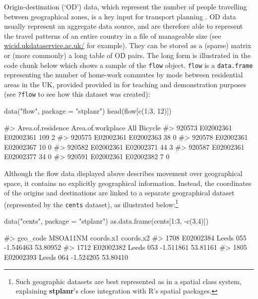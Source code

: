 Origin-destination (`OD') data, which represent the number of people travelling between
geographical zones, is a key input for transport planning \citep{calabrese_estimating_2011}.
OD data usually represent an aggregate data source, and are therefore able to represent the
travel patterns of an entire country in a file of manageable size
(see \href{http://wicid.ukdataservice.ac.uk/}{wicid.ukdataservice.ac.uk/} for example).
They can be stored as a (sparse) matrix or (more commonly) a long table of OD pairs.
The long form is illustrated in the code chunk below which shows a sample of
the \texttt{flow} object.
\texttt{flow} is a \texttt{data.frame} representing the number
of home-work commutes by mode between residential
areas in the UK, provided provided in 
for teaching and demonstration purposes
(see \texttt{?flow} to see how this dataset was created):

\begin{Schunk}
\begin{Sinput}
data("flow", package = "stplanr")
head(flow[c(1:3, 12)])
\end{Sinput}
\begin{Soutput}
#>        Area.of.residence Area.of.workplace All Bicycle
#> 920573         E02002361         E02002361 109       2
#> 920575         E02002361         E02002363  38       0
#> 920578         E02002361         E02002367  10       0
#> 920582         E02002361         E02002371  44       3
#> 920587         E02002361         E02002377  34       0
#> 920591         E02002361         E02002382   7       0
\end{Soutput}
\end{Schunk}

Although the flow data displayed above describes movement over
geographical space, it contains no explicitly geographical information.
Instead, the coordinates of the origins and destinations are linked to a
separate geographical dataset (represented by the \texttt{cents} dataset),
as illustrated below:\footnote{Such geographic datasets are best represented as in a spatial class system, explaining
\textbf{stplanr}'s close integration with R's spatial packages.}


\begin{Schunk}
\begin{Sinput}
data("cents", package = "stplanr")
as.data.frame(cents[1:3, -c(3,4)])
\end{Sinput}
\begin{Soutput}
#>       geo_code  MSOA11NM coords.x1 coords.x2
#> 1708 E02002384 Leeds 055 -1.546463  53.80952
#> 1712 E02002382 Leeds 053 -1.511861  53.81161
#> 1805 E02002393 Leeds 064 -1.524205  53.80410
\end{Soutput}
\end{Schunk}

